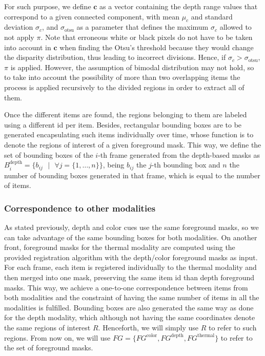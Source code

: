 \documentclass[10pt,twocolumn,letterpaper]{article}
\begin{document}
For such purpose, we define $\mathbf{c}$ as a vector containing the depth range values that correspond to a given connected component, with mean $\mu_{c}$ and standard deviation $\sigma_{c}$, and $\sigma_\mathrm{otsu}$ as a parameter that defines the maximum $\sigma_{c}$ allowed to not apply $\pi$. Note that erroneous white or black pixels do not have to be taken into account in $\mathbf{c}$ when finding the Otsu's threshold because they would change the disparity distribution, thus leading to incorrect divisions. Hence, if $\sigma_{c} > \sigma_\mathrm{otsu}$,  $\pi$ is applied. However, the assumption of bimodal distribution may not hold, so to take into account the possibility of more than two overlapping items the process is applied recursively to the divided regions in order to extract all of them. 

Once the different items are found, the regions belonging to them are labeled using a different id per item. Besides, rectangular bounding boxes are to be generated encapsulating such items individually over time, whose function is to denote the regions of interest of a given foreground mask. This way, we define the set of bounding boxes of the $i$-th frame generated from the depth-based masks as $B^\mathrm{depth}_i = \{b_{ij}\text{ }|\text{ }\forall j = \{1, \ldots, n\} \}$, being $b_{ij}$ the $j$-th bounding box and $n$ the number of bounding boxes generated in that frame, which is equal to the number of items.


\subsubsection{Correspondence to other modalities} 
\label{sssec:correspondence}
As stated previously, depth and color cues use the same foreground masks, so we can take advantage of the same bounding boxes for both modalities. On another front, foreground masks for the thermal modality are computed using the provided registration algorithm with the depth/color foreground masks as input. For each frame, each item is registered individually to the thermal modality and then merged into one mask, preserving the same item id than depth foreground masks. This way, we achieve a one-to-one correspondence between items from both modalities and the constraint of having the same number of items in all the modalities is fulfilled. Bounding boxes are also generated the same way as done for the depth modality, which although not having the same coordinates denote the same regions of interest $R$. Henceforth, we will simply use $R$ to refer to such regions. From now on, we will use $FG = \{FG^\mathrm{color}, FG^\mathrm{depth}, FG^\mathrm{thermal}\}$ to refer to the set of foreground masks.
\end{document}
